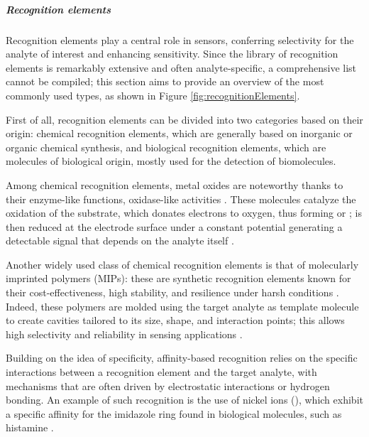 \subparagraph{Recognition elements}
Recognition elements play a central role in sensors, conferring selectivity for the analyte of interest and enhancing sensitivity. Since the library of recognition elements is remarkably extensive and often analyte-specific, a comprehensive list cannot be compiled; this section aims to provide an overview of the most commonly used types, as shown in Figure \ref{fig:recognitionElements}.

First of all, recognition elements can be divided into two categories based on their origin: chemical recognition elements, which are generally based on inorganic or organic chemical synthesis, and biological recognition elements, which are molecules of biological origin, mostly used for the detection of biomolecules.

Among chemical recognition elements, metal oxides are noteworthy thanks to their enzyme-like functions, \eg{} oxidase-like activities \citep{poolakkandyTransition2021}. These molecules catalyze the oxidation of the substrate, which donates electrons to oxygen, thus forming  or ;  is then reduced at the electrode surface under a constant potential generating a detectable signal that depends on the analyte itself \citep{liuReview2021}.

Another widely used class of chemical recognition elements is that of molecularly imprinted polymers (MIPs): these are synthetic recognition elements known for their cost-effectiveness, high stability, and resilience under harsh conditions \citep{uzunMolecularlyimprinted2016}. Indeed, these polymers are molded using the target analyte as template molecule to create cavities tailored to its size, shape, and interaction points; this allows high selectivity and reliability in sensing applications \citep{hassanBiomimetic2019}.

Building on the idea of specificity, affinity-based recognition relies on the specific interactions between a recognition element and the target analyte, with mechanisms that are often driven by electrostatic interactions or hydrogen bonding. An example of such recognition is the use of nickel ions (), which exhibit a specific affinity for the imidazole ring found in biological molecules, such as histamine \citep{fukushimaColorimetric2021}.

